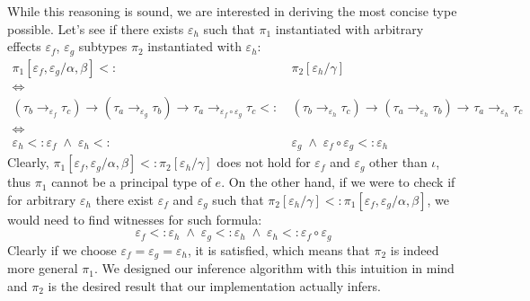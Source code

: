 \documentclass[declaration,shortabstract]{iithesis}
\theoremstyle{definition} \newtheorem{definition}{Definition}[section]
\newcommand{\arrow}[3]{{#1}\rightarrow_{#2}{#3}}
\begin{document}
While this reasoning is sound, we are interested in deriving the most concise type possible. Let's see if there exists $\varepsilon_h$ such that $\pi_1$ instantiated with arbitrary effects $\varepsilon_f$, $\varepsilon_g$ subtypes $\pi_2$ instantiated with $\varepsilon_h$:
\begin{align*}
    \pi_1[\varepsilon_f, \varepsilon_g / \alpha, \beta] <: & \: \pi_2 [\varepsilon_h / \gamma]
    \\ \iff \\ 
    \arrow{(\arrow{\tau_b}{\varepsilon_f}{\tau_c})}{}{
        \arrow{(\arrow{\tau_a}{\varepsilon_g}{\tau_b})}{}{
                \arrow{\tau_a}{\varepsilon_f \circ \varepsilon_g}{\tau_c}}} <: & \:
    \arrow{(\arrow{\tau_b}{\varepsilon_h}{\tau_c})}{}{
        \arrow{(\arrow{\tau_a}{\varepsilon_h}{\tau_b})}{}{
                \arrow{\tau_a}{\varepsilon_h}{\tau_c}}}
    \\ \iff \\ 
    \varepsilon_h <: \varepsilon_f          \;\wedge\; 
    \varepsilon_h <: &  \: \varepsilon_g    \;\wedge\; 
    \varepsilon_f \circ \varepsilon_g <: \varepsilon_h
\end{align*}
Clearly, $\pi_1[\varepsilon_f, \varepsilon_g / \alpha, \beta] <: \pi_2 [\varepsilon_h / \gamma]$
does not hold for $\varepsilon_f$ and $\varepsilon_g$ other than $\iota$, thus $\pi_1$ cannot be a principal type of $e$.
On the other hand, if we were to check if for arbitrary $\varepsilon_h$ there exist $\varepsilon_f$ and $\varepsilon_g$ such that
$\pi_2 [\varepsilon_h / \gamma] <: \pi_1[\varepsilon_f, \varepsilon_g / \alpha, \beta]$, we would need to find witnesses for such formula:
$$ \varepsilon_f <: \varepsilon_h          \;\wedge\; 
    \varepsilon_g <: \varepsilon_h    \;\wedge\; 
     \varepsilon_h <: \varepsilon_f \circ \varepsilon_g $$
Clearly if we choose $ \varepsilon_f = \varepsilon_g = \varepsilon_h$, it is satisfied, which means that $\pi_2$ is indeed more general $\pi_1$.
We designed our inference algorithm with this intuition in mind and $\pi_2$ is the desired result that our implementation actually infers.

\end{document}
